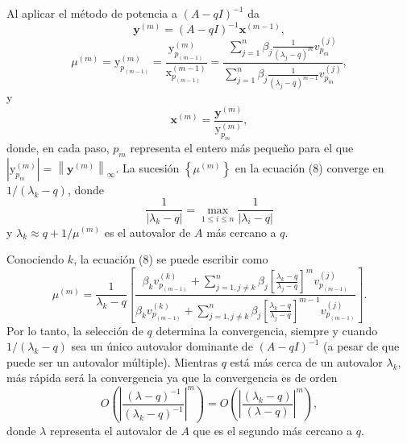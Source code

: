 \documentclass[12pt, a4paper]{article}
\numberwithin{subsection}{section} %
\begin{document}
        Al aplicar el método de potencia a $\left( A - qI \right)^{-1}$ da
        \begin{equation*}
        \textbf{y}^{\left( m \right)} = \left( A - qI \right)^{-1} \textbf{x}^{\left( m - 1 \right)},
        \end{equation*}
        \begin{equation}
        \mu^{\left( m \right)} = \text{y}_{p_{\left( m - 1 \right)}}^{\left( m \right)} = \frac{\text{y}_{p_{\left( m - 1 \right)}}^{\left( m \right)}}{\text{x}_{p_{\left( m - 1 \right)}}^{\left( m - 1 \right)}} = \frac{\sum_{j=1}^{n} \beta_{j} \frac{1}{\left( \lambda_{j} - q \right)^{m}} v_{p_{m}}^{\left( j \right)}}{\sum_{j=1}^{n} \beta_{j} \frac{1}{\left( \lambda_{j} - q \right)^{m-1}} v_{p_{m}}^{\left( j \right)}},
        \end{equation}
        y
        \begin{equation*}
        \textbf{x}^{\left( m \right)} = \frac{\textbf{y}^{\left( m \right)}}{\text{y}_{p_{m}}^{\left( m \right)}},
        \end{equation*}
        donde, en cada paso, $p_{m}$ representa el entero más pequeño para el que $\left| \text{y}_{p_{m}}^{\left( m \right)} \right| = \left\| \textbf{y}^{\left( m \right)} \right\|_{\infty }$. La sucesión $\left\{ \mu^{\left( m \right)} \right\}$ en la ecuación (8) converge en $1 / \left( \lambda_{k} - q \right)$, donde
        \begin{equation*}
        \frac{1}{\left| \lambda_{k} - q \right|} =\max_{1\le i\le n} \frac{1}{\left| \lambda_{i} - q \right|}
        \end{equation*}
        y $\lambda_{k} \approx q + 1 / \mu^{\left( m \right)}$ es el autovalor de $A$ más cercano a $q$.
        
        Conociendo $k$, la ecuación (8) se puede escribir como
        \begin{equation}
        \mu^{\left( m \right)} = \frac{1}{\lambda_{k} - q} \left[ \frac{\beta_{k} v_{p_{\left( m - 1 \right)}}^{\left( k \right)} + 
        \sum_{j=1, j\neq k}^{n} \beta_{j} \left[ \frac{\lambda_{k} - q}{\lambda_{j} - q} \right]^{m} v_{p_{\left( m - 1 \right)}}^{\left( j \right)}}{\beta_{k} v_{p_{\left( m - 1 \right)}}^{\left( k \right)} + 
        \sum_{j=1, j\neq k}^{n} \beta_{j} \left[ \frac{\lambda_{k} - q}{\lambda_{j} - q} \right]^{m-1} v_{p_{\left( m - 1 \right)}}^{\left( j \right)}} \right].
        \end{equation}
        Por lo tanto, la selección de $q$ determina la convergencia, siempre y cuando $1 / \left( \lambda_{k} - q \right)$ sea un único autovalor dominante de $\left( A - qI \right)^{-1}$ (a pesar de que puede ser un autovalor múltiple). Mientras $q$ está más cerca de un autovalor $\lambda_{k}$, más rápida será la convergencia ya que la convergencia es de orden
        \begin{equation*}
        O\left( \left| \frac{\left( \lambda - q \right)^{-1}}{\left( \lambda_{k} - q \right)^{-1}} \right|^{m} \right) = O \left( \left| \frac{\left( \lambda_{k} - q \right)}{\left( \lambda - q \right)} \right|^{m} \right),
        \end{equation*}
        donde $\lambda$ representa el autovalor de $A$ que es el segundo más cercano a $q$.
        
\end{document}
